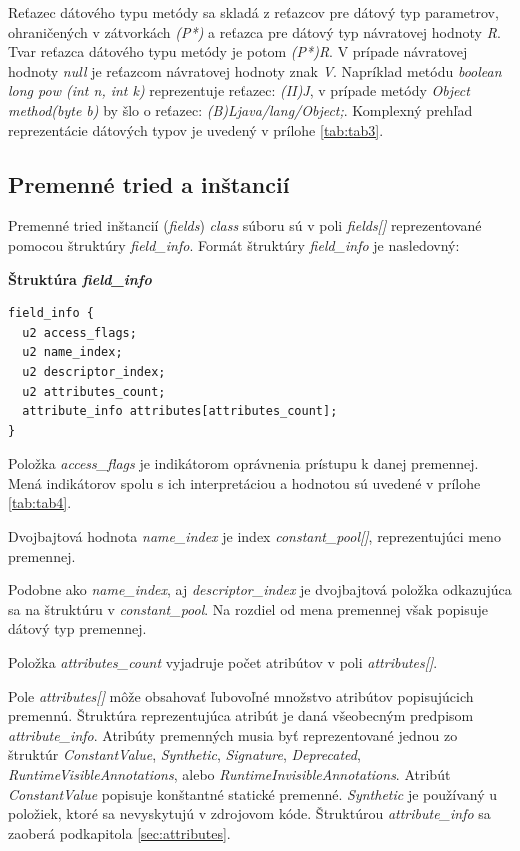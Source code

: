 \documentclass[11pt,final,oneside]{fithesis}
\newenvironment{example}[1]
{
\vspace{3mm}
\noindent\textbf{#1}
\vspace{2mm}
}
{
\vspace{3mm}
}
\begin{document}
Reťazec dátového typu metódy sa skladá z reťazcov pre dátový typ parametrov,
ohraničených v zátvorkách \textit{(P*)} a reťazca pre dátový typ návratovej
hodnoty \textit{R}. Tvar reťazca dátového typu metódy je potom \textit{(P*)R}.
V prípade návratovej hodnoty \textit{null} je reťazcom návratovej hodnoty znak
\textit{V}. Napríklad metódu \textit{boolean long pow (int n, int k)}
reprezentuje reťazec: \textit{(II)J}, v prípade metódy
\textit{Object method(byte b)} by šlo o reťazec:
\textit{(B)Ljava/lang/Object;}. Komplexný prehľad reprezentácie dátových typov
je uvedený v prílohe \ref{tab:tab3}.

\subsection{Premenné tried a inštancií}
\label{sec:fields}
Premenné tried inštancií (\textit{fields}) \textit{class} súboru sú v poli
\textit{fields[]} reprezentované pomocou štruktúry \textit{field\_info}.
Formát štruktúry \textit{field\_info} je nasledovný:

\begin{example}{Štruktúra \textit{field\_info}}
\begin{verbatim}
field_info {
  u2 access_flags;
  u2 name_index;
  u2 descriptor_index;
  u2 attributes_count;
  attribute_info attributes[attributes_count];
}
\end{verbatim}
\end{example}

Položka \textit{access\_flags} je indikátorom oprávnenia prístupu k danej
premennej. Mená indikátorov spolu s ich interpretáciou a hodnotou sú uvedené v
prílohe \ref{tab:tab4}.
     
Dvojbajtová hodnota \textit{name\_index} je index \textit{constant\_pool[]},
reprezentujúci meno premennej.

Podobne ako \textit{name\_index}, aj \textit{descriptor\_index} je dvojbajtová
položka odkazujúca sa na štruktúru v \textit{constant\_pool}. Na rozdiel od
mena premennej však popisuje dátový typ premennej.

Položka \textit{attributes\_count} vyjadruje počet atribútov v poli
\textit{attributes[]}.

Pole \textit{attributes[]} môže obsahovať ľubovoľné množstvo atribútov
popisujúcich premennú. Štruktúra reprezentujúca atribút je daná všeobecným
predpisom \textit{attribute\_info}. Atribúty premenných musia byť
reprezentované jednou zo štruktúr \textit{ConstantValue}, \textit{Synthetic},
\textit{Signature}, \textit{Deprecated}, \textit{RuntimeVisibleAnnotations},
alebo \textit{RuntimeInvisibleAnnotations}. Atribút \textit{ConstantValue}
popisuje konštantné statické premenné. \textit{Synthetic} je používaný u
položiek, ktoré sa nevyskytujú v zdrojovom kóde. Štruktúrou
\textit{attribute\_info} sa zaoberá podkapitola \ref{sec:attributes}.
\end{document}
